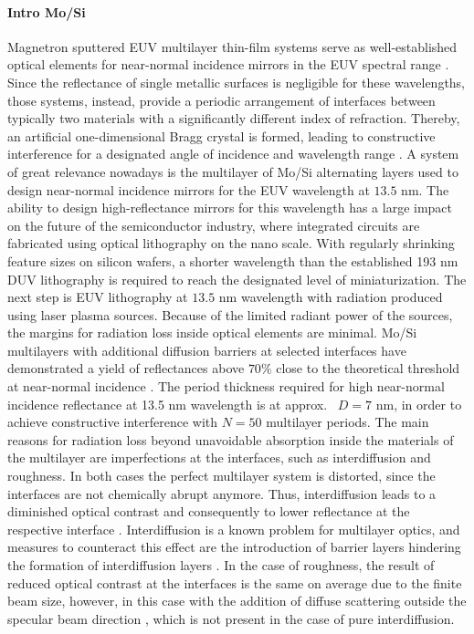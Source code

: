 \paragraph{Intro Mo/Si}
Magnetron sputtered EUV multilayer thin-film systems serve as well-established optical elements for near-normal incidence mirrors in the EUV spectral range \cite{martinez-galarce_high_2000,barbee_jr._multi-spectral_1991,toyoda_soft-x-ray_2000,finkenthal_near_1990}. Since the reflectance of single metallic surfaces is negligible for these wavelengths, those systems, instead, provide a periodic arrangement of interfaces between typically two materials with a significantly different index of refraction. Thereby, an artificial one-dimensional Bragg crystal is formed, leading to constructive interference for a designated angle of incidence and wavelength range \cite{spiller_low-loss_1972}. A system of great relevance nowadays is the multilayer of Mo/Si alternating layers used to design near-normal incidence mirrors for the EUV wavelength at $13.5$ nm. The ability to design high-reflectance mirrors for this wavelength has a large impact on the future of the semiconductor industry, where integrated circuits are fabricated using optical lithography on the nano scale. With regularly shrinking feature sizes on silicon wafers, a shorter wavelength than the established 193 nm DUV lithography is required to reach the designated level of miniaturization. The next step is EUV lithography at $13.5$ nm wavelength with radiation produced using laser plasma sources. Because of the limited radiant power of the sources, the margins for radiation loss inside optical elements are minimal. Mo/Si multilayers with additional diffusion barriers at selected interfaces have demonstrated a yield of reflectances above $70\%$ close to the theoretical threshold at near-normal incidence \cite{barbee_molybdenum-silicon_1985,stearns_fabrication_1991,bajt_improved_2002,braun_grenzflachen-optimierte_2003}. The period thickness required for high near-normal incidence reflectance at 13.5 nm wavelength is at approx.~ $D=7$ nm, in order to achieve constructive interference with $N=50$ multilayer periods. The main reasons for radiation loss beyond unavoidable absorption inside the materials of the multilayer are imperfections at the interfaces, such as interdiffusion and roughness. In both cases the perfect multilayer system is distorted, since the interfaces are not chemically abrupt anymore. Thus, interdiffusion leads to a diminished optical contrast and consequently to lower reflectance at the respective interface \cite{nakajima_interdiffusion_1988}. Interdiffusion is a known problem for multilayer optics, and measures to counteract this effect are the introduction of barrier layers hindering the formation of interdiffusion layers \cite{braun_grenzflachen-optimierte_2003,braun_mo/si_2002}. In the case of roughness, the result of reduced optical contrast at the interfaces is the same on average due to the finite beam size, however, in this case with the addition of diffuse scattering outside the specular beam direction \cite{sinha_x-ray_1994}, which is not present in the case of pure interdiffusion.

